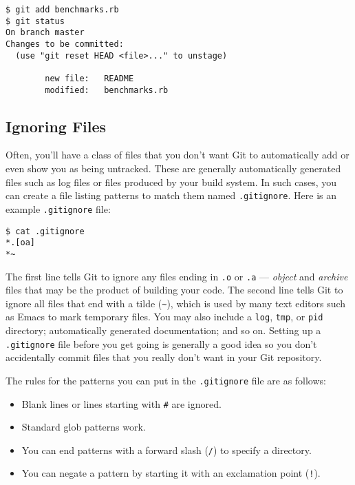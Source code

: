 \documentclass[a4paper]{book}
\begin{document}
\begin{shaded}\begin{verbatim}
$ git add benchmarks.rb
$ git status
On branch master
Changes to be committed:
  (use "git reset HEAD <file>..." to unstage)

        new file:   README
        modified:   benchmarks.rb
\end{verbatim}\end{shaded}

\subsection{Ignoring Files}\label{ignoring-files}

Often, you'll have a class of files that you don't want Git to automatically add or even show you as being untracked. These are generally automatically generated files such as log files or files produced by your build system. In such cases, you can create a file listing patterns to match them named \texttt{.gitignore}. Here is an example \texttt{.gitignore} file:

\begin{shaded}\begin{verbatim}
$ cat .gitignore
*.[oa]
*~
\end{verbatim}\end{shaded}

The first line tells Git to ignore any files ending in \texttt{.o} or \texttt{.a} --- \emph{object} and \emph{archive} files that may be the product of building your code. The second line tells Git to ignore all files that end with a tilde (\texttt{\textasciitilde{}}), which is used by many text editors such as Emacs to mark temporary files. You may also include a \texttt{log}, \texttt{tmp}, or \texttt{pid} directory; automatically generated documentation; and so on. Setting up a \texttt{.gitignore} file before you get going is generally a good idea so you don't accidentally commit files that you really don't want in your Git repository.

The rules for the patterns you can put in the \texttt{.gitignore} file are as follows:

\begin{itemize}
\itemsep1pt\parskip0pt
\item
  Blank lines or lines starting with \texttt{\#} are ignored.
\item
  Standard glob patterns work.
\item
  You can end patterns with a forward slash (\texttt{/}) to specify a directory.
\item
  You can negate a pattern by starting it with an exclamation point (\texttt{!}).
\end{itemize}
\end{document}
